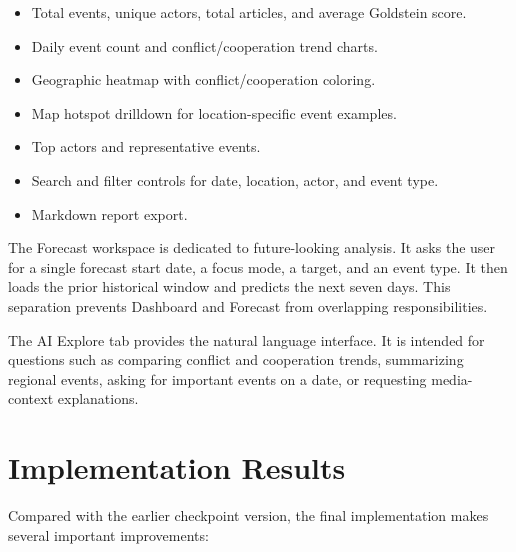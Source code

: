 \documentclass[11pt]{article}
\begin{document}
\begin{itemize}
    \item Total events, unique actors, total articles, and average Goldstein score.
    \item Daily event count and conflict/cooperation trend charts.
    \item Geographic heatmap with conflict/cooperation coloring.
    \item Map hotspot drilldown for location-specific event examples.
    \item Top actors and representative events.
    \item Search and filter controls for date, location, actor, and event type.
    \item Markdown report export.
\end{itemize}

The Forecast workspace is dedicated to future-looking analysis. It asks the user for a single forecast start date, a focus mode, a target, and an event type. It then loads the prior historical window and predicts the next seven days. This separation prevents Dashboard and Forecast from overlapping responsibilities.

The AI Explore tab provides the natural language interface. It is intended for questions such as comparing conflict and cooperation trends, summarizing regional events, asking for important events on a date, or requesting media-context explanations.

\section{Implementation Results}

Compared with the earlier checkpoint version, the final implementation makes several important improvements:
\end{document}
